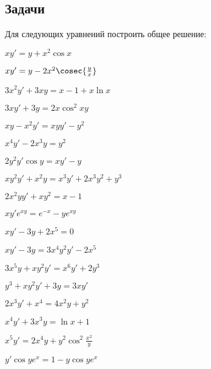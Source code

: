 \subsection{Задачи}
	
	Для следующих уравнений построить общее решение:
	\begin{multicols}{2}
		\begin{enumtasks}

			\item \( xy' = y + x^2 \cos{x} \) 														%
			\item \( xy' = y - 2x^2 \cosec{\frac{y}{x}} \) 											%
			\item \( 3x^2 y' + 3xy = x - 1 + x\ln{x} \) 											%
			\item \( 3xy' + 3y = 2x \cos^2{xy} \) 													%
			\item \( xy - x^2y' = xyy' - y^2 \) 													%
			\item \( x^4 y' - 2x^3 y = y^2 \) 														%
			\item \( 2y^2 y' \cos{y} = xy' - y \) 													%
			\item \( xy^2 y' + x^2 y = x^3y' + 2x^3 y^2 + y^3 \) 									%
			\item \( 2x^2 y y' + xy^2 = x - 1 \) 													%
			\item \( xy' e^{xy} = e^{-x} - ye^{xy} \)												%
			\item \( xy' - 3y + 2x^5 = 0 \) 														%
			\item \( xy' - 3y = 3x^4 y^2 y' - 2x^5 \) 												%
			\item \( 3x^5 y + xy^2 y' = x^6 y' + 2y^3 \) 											%
			\item \( y^3 + xy^2 y' + 3y = 3xy' \) 													%
			\item \( 2x^3 y' + x^4 = 4x^2 y + y^2 \) 												%
			\item \( x^4 y' + 3x^3 y = \ln{x} + 1 \) 												%
			\item \( x^5 y' = 2x^4 y + y^2 \cos^2{\frac{x^2}{y}} \)									%
			\item \( y' \cos{ye^{x}} = 1 - y \cos{ye^{x}} \)										%

\end{enumtasks}
\end{multicols}
